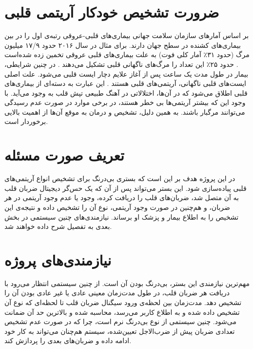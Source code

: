 
\pagebreak

\section{ضرورت تشخیص خودکار آریتمی قلبی}
بر اساس آمارهای سازمان سلامت جهانی بیماری‌های قلبی-عروقی رتبه‌ی اول را در بین بیماری‌های کشنده در سطح جهان دارند. برای مثال در سال ۲۰۱۶ حدود ۱۷/۹ میلیون مرگ (حدود ۳۱٪ آمار کلی فوت) به علت بیماری‌های قلبی عروقی تخمین زده شده‌است \cite{WHO}. حدود ۲۵٪ این تعداد را مرگ‌های ناگهانی قلبی تشکیل می‌دهند \cite{Srinivasan2018}. در چنین شرایطی، بیمار در طول مدت یک ساعت پس از آغاز علایم دچار ایست قلبی می‌شود. 
علت اصلی ایست‌های قلبی ناگهانی، آریتمی‌های قلبی هستند \cite{Cleveland}. این عبارت به دسته‌ای از بیماری‌های قلبی اطلاق می‌شود که در آن‌ها، اختلالاتی در آهنگ طبیعی تپش قلب به وجود می‌آید. با وجود این که بیشتر آریتمی‌ها بی خطر هستند، در برخی موارد در صورت عدم رسیدگی می‌توانند مرگبار باشند. به همین دلیل، تشخیص و درمان به موقع آن‌ها از اهمیت بالایی برخوردار است.

\section{تعریف صورت مسئله} 
در این پروژه هدف بر این است که بستری بی‌درنگ برای تشخیص انواع آریتمی‌های قلبی پیاده‌سازی شود. این بستر می‌تواند پس از آن که یک حس‌گر دیجیتال ضربان قلب به آن متصل شد، ضربان‌های قلب را دریافت کرده، وجود یا عدم وجود آریتمی در هر ضربان، و هم‌چنین در صورت وجود آریتمی، نوع آن را تشخیص داده و نتیجه‌ی این تشخیص را به اطلاع بیمار و پزشک او برساند. نیازمندی‌های چنین سیستمی در بخش بعدی به تفصیل شرح داده خواهند شد.

\section{نیازمندی‌های پروژه}
مهم‌ترین نیازمندی این بستر، بی‌درنگ بودن آن است. از چنین سیستمی انتظار می‌رود با دریافت هر ضربان قلب، در طول مدت‌زمان معینی عادی یا غیر عادی بودن آن را تشخیص دهد. مدت‌زمان بین لحظه‌ی ورود سیگنال ضربان قلب تا لحظه‌ای که نوع آن تشخیص داده شده و به اطلاع کاربر می‌رسد، محاسبه شده و بالاترین حد آن ضمانت می‌شود. چنین سیستمی از نوع بی‌درنگ نرم است، چرا که در صورت عدم تشخیص تعدادی ضربان پیش از ضرب‌الاجل تعیین‌شده، سیستم هم‌چنان می‌تواند به کار خود ادامه داده و ضربان‌های بعدی را پردازش کند.

